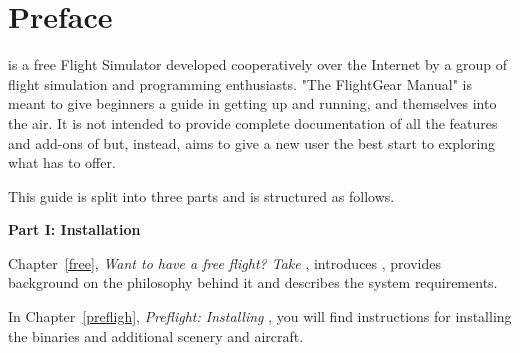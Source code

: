 
\chapter*{Preface\label{preface}}

\FlightGear{} is a free Flight Simulator developed cooperatively over the Internet 
by a group of flight simulation and programming enthusiasts. "The
FlightGear Manual" is meant to give beginners a guide in getting
\FlightGear{} up and running, and themselves into the air. It is not
intended to provide complete documentation of all the features and
add-ons of \FlightGear{} but, instead, aims to give a new user the best
start to exploring what \FlightGear{} has to offer.

This guide is split into three parts and is structured as follows.

\medskip

\noindent
\textbf{Part I: Installation}
\medskip

 \noindent
Chapter~\ref{free}, \textit{Want to have a free flight? Take \FlightGear{}}, introduces
\FlightGear{}, provides background on the philosophy behind it and describes the system requirements.
 \medskip

 \noindent
In Chapter~\ref{prefligh}, \textit{Preflight: Installing \FlightGear{}}, you will find
instructions for installing the binaries and additional scenery and aircraft. 
 \medskip

